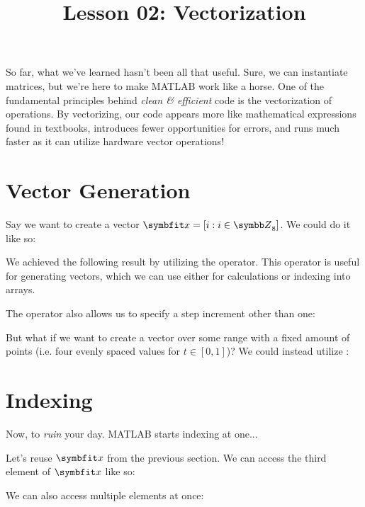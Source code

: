 \documentclass{article}
\title{Lesson 02: Vectorization}
\begin{document}
\renderTitle

So far, what we've learned hasn't been all that useful.  Sure, we can
instantiate matrices, but we're here to make MATLAB work like a horse.
One of the fundamental principles behind \emph{clean \& efficient} code
is the vectorization of operations.  By vectorizing, our code appears
more like mathematical expressions found in textbooks, introduces fewer
opportunities for errors, and runs much faster as it can utilize
hardware vector operations!

\section{Vector Generation}

Say we want to create a vector \(\mat{x} = [i : i \in \Z_8]\).  We could
do it like so:


We achieved the following result by utilizing the  operator.  This operator
is useful for generating vectors, which we can use either for
calculations or indexing into arrays.

The operator also allows us to specify a step increment other than one:


But what if we want to create a vector over some range with a fixed
amount of points (i.e. four evenly spaced values for \(t \in [0, 1]\))?
We could instead utilize :


\section{Indexing}

Now, to \emph{ruin} your day.  MATLAB starts indexing at one...

Let's reuse \(\mat{x}\) from the previous section.  We can access the
third element of \(\mat{x}\) like so:


We can also access multiple elements at once:

\end{document}
